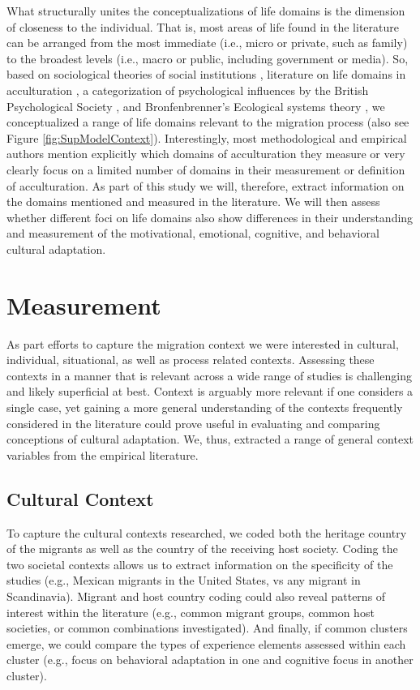 \documentclass[man, 12pt, a4paper]{apa7}
\begin{document}
What structurally unites the conceptualizations of life domains is the dimension of closeness to the individual. That is, most areas of life found in the literature can be arranged from the most immediate (i.e., micro or private, such as family) to the broadest levels (i.e., macro or public, including government or media). So, based on sociological theories of social institutions \citep{Durkheim1982}, literature on life domains in acculturation \citep{Arends-Toth2006, Arends-Toth2007, Zane2004}, a categorization of psychological influences by the British Psychological Society \citep{Michie2005a}, and Bronfenbrenner's Ecological systems theory \citep{Bronfenbrenner1992}, we conceptualized a range of life domains relevant to the migration process (also see Figure \ref{fig:SupModelContext}). Interestingly, most methodological and empirical authors mention explicitly which domains of acculturation they measure or very clearly focus on a limited number of domains in their measurement or definition of acculturation. As part of this study we will, therefore, extract information on the domains mentioned and measured in the literature. We will then assess whether different foci on life domains also show differences in their understanding and measurement of the motivational, emotional, cognitive, and behavioral cultural adaptation.

\section{Measurement}
As part efforts to capture the migration context we were interested in cultural, individual, situational, as well as process related contexts. Assessing these contexts in a manner that is relevant across a wide range of studies is challenging and likely superficial at best. Context is arguably more relevant if one considers a single case, yet gaining a more general understanding of the contexts frequently considered in the literature could prove useful in evaluating and comparing conceptions of cultural adaptation. We, thus, extracted a range of general context variables from the empirical literature.

\subsection{Cultural Context}
To capture the cultural contexts researched, we coded both the heritage country of the migrants as well as the country of the receiving host society. Coding the two societal contexts allows us to extract information on the specificity of the studies (e.g., Mexican migrants in the United States, vs any migrant in Scandinavia). Migrant and host country coding could also reveal patterns of interest within the literature (e.g., common migrant groups, common host societies, or common combinations investigated). And finally, if common clusters emerge, we could compare the types of experience elements assessed within each cluster (e.g., focus on behavioral adaptation in one and cognitive focus in another cluster). 
\end{document}
